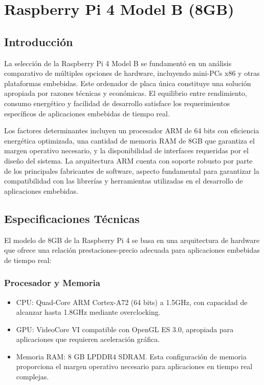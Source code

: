 \chapter{Raspberry Pi 4 Model B (8GB)}

\section{Introducción}

La selección de la Raspberry Pi 4 Model B \cite{raspberrypi4} se fundamentó en un análisis comparativo de múltiples opciones de hardware, incluyendo mini-PCs x86 y otras plataformas embebidas. Este ordenador de placa única constituye una solución apropiada por razones técnicas y económicas. El equilibrio entre rendimiento, consumo energético y facilidad de desarrollo satisface los requerimientos específicos de aplicaciones embebidas de tiempo real.

Los factores determinantes incluyen un procesador ARM de 64 bits con eficiencia energética optimizada, una cantidad de memoria RAM de 8GB que garantiza el margen operativo necesario, y la disponibilidad de interfaces requeridas por el diseño del sistema. La arquitectura ARM cuenta con soporte robusto por parte de los principales fabricantes de software, aspecto fundamental para garantizar la compatibilidad con las librerías y herramientas utilizadas en el desarrollo de aplicaciones embebidas.

\section{Especificaciones Técnicas}

El modelo de 8GB de la Raspberry Pi 4 se basa en una arquitectura de hardware que ofrece una relación prestaciones-precio adecuada para aplicaciones embebidas de tiempo real:

\subsection{Procesador y Memoria}

\begin{itemize}
    \item CPU: Quad-Core ARM Cortex-A72 (64 bits) a 1.5GHz, con capacidad de alcanzar hasta 1.8GHz mediante overclocking.
    \item GPU: VideoCore VI compatible con OpenGL ES 3.0, apropiada para aplicaciones que requieren aceleración gráfica.
    \item Memoria RAM: 8 GB LPDDR4 SDRAM. Esta configuración de memoria proporciona el margen operativo necesario para aplicaciones en tiempo real complejas.
\end{itemize}

